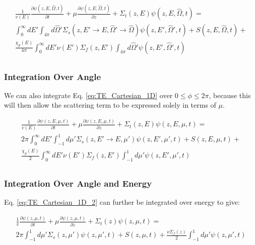 \documentclass[10pt]{article}
\newcommand{\hO}{\hat{\Omega}}
\begin{document}
\begin{flushleft}
\begin{equation}
\label{eq:TE_Cartesian_1D}
\begin{aligned}
\frac{1}{v(E)} \frac{\partial\psi(z, E, \hO  ,t)}{\partial t} +
 \mu \frac{\partial \psi(z, E, \hO  ,t)}{\partial z} + \Sigma_t(z,E)\psi(z, E, \hO  ,t) = \\
 \int_{0}^{\infty}dE' \int_{4\pi}^{ } d\hO  ' \Sigma_s(z, E'\rightarrow E, \hO  '\rightarrow\hO  )\psi(z, E', \hO  ',t) + S(z, E, \hO  ,t)+\\
 \frac{\chi_p(E)}{4\pi} \int_{0}^{\infty} dE'\nu(E')\Sigma_f(z, E')\int_{4\pi}^{} d\hO  '\psi(z, E', \hO  ',t)\\
\end{aligned}
\end{equation}

\subsubsection{Integration Over Angle}

We can also integrate Eq. \ref{eq:TE_Cartesian_1D} over \(0\leq \phi \leq 2\pi\), because this will then allow the scattering term to be expressed solely in terms of \(\mu\). 

\begin{equation}
\label{eq:TE_Cartesian_1D_2}
\begin{aligned}
\frac{1}{v(E)} \frac{\partial\psi(z, E, \mu,t)}{\partial t} + \mu \frac{\partial \psi(z, E, \mu,t)}{\partial z} +
 \Sigma_t(z,E)\psi(z, E, \mu,t) =\\
 2\pi \int_{0}^{\infty}dE' \int_{-1}^{1} d\mu' \Sigma_s(z, E'\rightarrow E, \mu')\psi(z, E', \mu',t) + S(z, E, \mu, t)+\\
 \frac{\chi_p(E)}{2} \int_{0}^{\infty} dE'\nu(E')\Sigma_f(z, E')\int_{-1}^{1} d\mu'\psi(z, E', \mu',t)\\
\end{aligned}
\end{equation}

\subsubsection{Integration Over Angle and Energy}
Eq. \eqref{eq:TE_Cartesian_1D_2} can further be integrated over energy to give:

\begin{equation}
\label{eq:TE_Cartesian_1D_2_noenergy}
\begin{aligned}
\frac{1}{v} \frac{\partial\psi(z, \mu,t)}{\partial t} + \mu \frac{\partial \psi(z, \mu,t)}{\partial z} +
 \Sigma_t(z)\psi(z, \mu,t) =\\
 2\pi\int_{-1}^{1} d\mu' \Sigma_s(z, \mu')\psi(z,\mu',t) + S(z, \mu, t)+\frac{\nu\Sigma_f(z)}{2}\int_{-1}^{1} d\mu'\psi(z, \mu',t)\\
\end{aligned}
\end{equation}


\end{flushleft}
\end{document}
